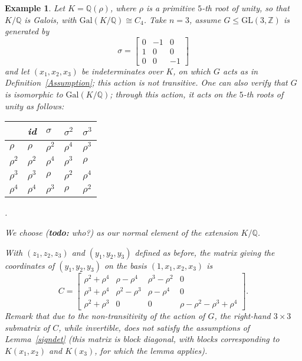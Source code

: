 \documentclass[12pt]{article}
\theoremstyle{plain}
\newtheorem{example}[theorem]{Example}
\def\todo#1{(\textbf{todo:} #1)}
\newcommand{\Z}{\ensuremath{\mathbb{Z}}}
\newcommand{\Q}{\ensuremath{\mathbb{Q}}}
\begin{document}
\begin{example}
Let $K= \Q(\rho)$, where $\rho$ is a primitive $5$-th root of unity,
so that $K/\Q$ is Galois, with $\mathrm{Gal}(K/\Q) \cong C_4$.
Take $n=3$, assume $G\leq \mathrm{GL}(3,\Z)$ is generated by $$
\sigma = \begin{bmatrix}
0&-1&0\\
1&0&0\\
0&0&-1
\end{bmatrix}$$ and let $(x_1, x_2, x_3)$ be
indeterminates over $K$, on which $G$ acts as in Definition~\ref{Assumption};
this action is not transitive.
One can also verify that $G$ is isomorphic to $\mathrm{Gal}(K/\Q)$;
through this action, it acts on the $5$-th roots of unity as follows:
\begin{table}[H]
\centering
\begin{tabular}{l|llll} 
& id & $\sigma$ & $\sigma^2$ & $\sigma^3$\\
\hline
$\rho$ & $\rho$ & $\rho^2$ & $\rho^4$ &  $\rho^3$\\
$\rho^2$ & $\rho^2$ & $\rho^4$ & $\rho^3$ &  $\rho$\\
$\rho^3$ & $\rho^3$ & $\rho$ & $\rho^2$ &  $\rho^4$\\
$\rho^4$ & $\rho^4$ & $\rho^3$ & $\rho$ &  $\rho^2$
\end{tabular}.
\end{table}
We choose \todo{who?} as our normal element of the extension $K/\Q$.

With $(z_1,z_2,z_3)$ and $(y_1,y_2,y_3)$
defined as before, the matrix giving the coordinates of
$(y_1,y_2,y_3)$ on the basis $(1,x_1,x_2,x_3)$ is
$$C= \begin{bmatrix}
\rho^2+\rho^4 & \rho -\rho^4 & \rho^3 -\rho^2 & 0\\
\rho^3+\rho^4 & \rho^2 -\rho^3 & \rho -\rho^4 &0 \\
\rho^2+\rho^3 &0 &0 & \rho - \rho^2 -\rho^3+\rho^4
\end{bmatrix}.
$$ Remark that due to the non-transitivity of the action of $G$, the
right-hand $3 \times 3$ submatrix of $C$, while invertible, does not satisfy
the assumptions of Lemma~\ref{signdet} (this matrix is block diagonal,
with blocks corresponding to $K(x_1,x_2)$ and $K(x_3)$, for which the
lemma applies).
\end{example}




\end{document}
